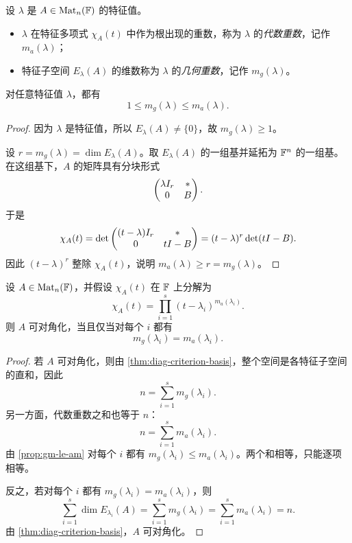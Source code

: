 \begin{definition}
设 \(\lambda\) 是 \(A\in \mathrm{Mat}_n(\mathbb{F})\) 的特征值。
\begin{itemize}
  \item \(\lambda\) 在特征多项式 \(\chi_A(t)\) 中作为根出现的重数，称为 \(\lambda\) 的\emph{代数重数}，记作 \(m_a(\lambda)\)；
  \item 特征子空间 \(E_\lambda(A)\) 的维数称为 \(\lambda\) 的\emph{几何重数}，记作 \(m_g(\lambda)\)。
\end{itemize}
\end{definition}

\begin{proposition}\label{prop:gm-le-am}
对任意特征值 \(\lambda\)，都有
\[
1\le m_g(\lambda)\le m_a(\lambda).
\]
\end{proposition}

\begin{proof}
因为 \(\lambda\) 是特征值，所以 \(E_\lambda(A)\neq\{0\}\)，故 \(m_g(\lambda)\ge 1\)。

设 \(r=m_g(\lambda)=\dim E_\lambda(A)\)。取 \(E_\lambda(A)\) 的一组基并延拓为 \(\mathbb{F}^n\) 的一组基。在这组基下，\(A\) 的矩阵具有分块形式
\[
\begin{pmatrix} \lambda I_r & *\\0 & B \end{pmatrix}.
\]
于是
\[
\chi_A(t)=\det\begin{pmatrix} (t-\lambda)I_r & *\\0 & tI-B \end{pmatrix}
=(t-\lambda)^r\det(tI-B).
\]
因此 \((t-\lambda)^r\) 整除 \(\chi_A(t)\)，说明 \(m_a(\lambda)\ge r=m_g(\lambda)\)。
\end{proof}

\begin{theorem}\label{thm:diag-am-gm}
设 \(A\in \mathrm{Mat}_n(\mathbb{F})\)，并假设 \(\chi_A(t)\) 在 \(\mathbb{F}\) 上分解为
\[
\chi_A(t)=\prod_{i=1}^s (t-\lambda_i)^{m_a(\lambda_i)}.
\]
则 \(A\) 可对角化，当且仅当对每个 \(i\) 都有
\[
m_g(\lambda_i)=m_a(\lambda_i).
\]
\end{theorem}

\begin{proof}
若 \(A\) 可对角化，则由 \cref{thm:diag-criterion-basis}，整个空间是各特征子空间的直和，因此
\[
n=\sum_{i=1}^s m_g(\lambda_i).
\]
另一方面，代数重数之和也等于 \(n\)：
\[
n=\sum_{i=1}^s m_a(\lambda_i).
\]
由 \cref{prop:gm-le-am} 对每个 \(i\) 都有 \(m_g(\lambda_i)\le m_a(\lambda_i)\)。两个和相等，只能逐项相等。

反之，若对每个 \(i\) 都有 \(m_g(\lambda_i)=m_a(\lambda_i)\)，则
\[
\sum_{i=1}^s \dim E_{\lambda_i}(A)=\sum_{i=1}^s m_g(\lambda_i)=\sum_{i=1}^s m_a(\lambda_i)=n.
\]
由 \cref{thm:diag-criterion-basis}，\(A\) 可对角化。
\end{proof}

